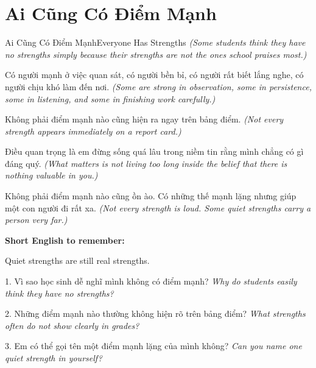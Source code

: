 \section{Ai Cũng Có Điểm Mạnh}
\begin{truyen}{Ai Cũng Có Điểm Mạnh}{Everyone Has Strengths}
\textit{(Some students think they have no strengths simply because their strengths are not the ones school praises most.)}

Có người mạnh ở việc quan sát, có người bền bỉ, có người rất biết lắng nghe, có người chịu khó làm đến nơi.
\textit{(Some are strong in observation, some in persistence, some in listening, and some in finishing work carefully.)}

Không phải điểm mạnh nào cũng hiện ra ngay trên bảng điểm.
\textit{(Not every strength appears immediately on a report card.)}

Điều quan trọng là em đừng sống quá lâu trong niềm tin rằng mình chẳng có gì đáng quý.
\textit{(What matters is not living too long inside the belief that there is nothing valuable in you.)}
\end{truyen}

\begin{baihoc}
Không phải điểm mạnh nào cũng ồn ào. Có những thế mạnh lặng nhưng giúp một con người đi rất xa.
\textit{(Not every strength is loud. Some quiet strengths carry a person very far.)}
\end{baihoc}

\begin{ghinhoanh}
\textbf{Short English to remember:}

Quiet strengths are still real strengths.

\end{ghinhoanh}

\begin{tuhocnhanh}
1. Vì sao học sinh dễ nghĩ mình không có điểm mạnh? \textit{Why do students easily think they have no strengths?}

2. Những điểm mạnh nào thường không hiện rõ trên bảng điểm? \textit{What strengths often do not show clearly in grades?}

3. Em có thể gọi tên một điểm mạnh lặng của mình không? \textit{Can you name one quiet strength in yourself?}
\end{tuhocnhanh}
\ngancach

